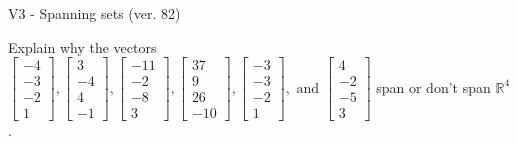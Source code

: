 \begin{exercise}
  \begin{exerciseTitle}V3 - Spanning sets (ver. 82)\end{exerciseTitle}
  \begin{exerciseStatement}
    Explain why the vectors \(\left[\begin{array}{r}
-4 \\
-3 \\
-2 \\
1
\end{array}\right] , \left[\begin{array}{r}
3 \\
-4 \\
4 \\
-1
\end{array}\right] , \left[\begin{array}{r}
-11 \\
-2 \\
-8 \\
3
\end{array}\right] , \left[\begin{array}{r}
37 \\
9 \\
26 \\
-10
\end{array}\right] , \left[\begin{array}{r}
-3 \\
-3 \\
-2 \\
1
\end{array}\right] , \text{ and } \left[\begin{array}{r}
4 \\
-2 \\
-5 \\
3
\end{array}\right]\) span or don't span \(\mathbb{R}^4\). 
	



\end{exerciseStatement}
\end{exercise}
